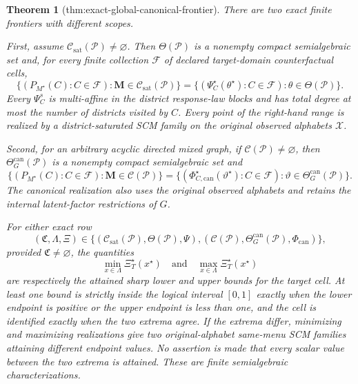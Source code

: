 \documentclass{article}
\newtheorem{theorem}{Theorem}
\begin{document}
\begin{theorem}[thm:exact-global-canonical-frontier]\label{thm:exact-global-canonical-frontier}
There are two exact finite frontiers with different scopes.

First, assume \(\mathcal C_{\mathrm{sat}}(\mathcal P)\ne\varnothing\). Then \(\Theta(\mathcal P)\) is a nonempty compact semialgebraic set and, for every finite collection \(\mathcal F\) of declared target-domain counterfactual cells,
\[
\{(P_{M^\star}(C):C\in\mathcal F):\mathbf M\in\mathcal C_{\mathrm{sat}}(\mathcal P)\}
=
\{(\Psi_C^\star(\theta^\star):C\in\mathcal F):\theta\in\Theta(\mathcal P)\}.
\]
Every \(\Psi_C^s\) is multi-affine in the district response-law blocks and has total degree at most the number of districts visited by \(C\). Every point of the right-hand range is realized by a district-saturated SCM family on the original observed alphabets \(\mathcal X\).

Second, for an arbitrary acyclic directed mixed graph, if \(\mathcal C(\mathcal P)\ne\varnothing\), then \(\Theta_G^{\mathrm{can}}(\mathcal P)\) is a nonempty compact semialgebraic set and
\[
\{(P_{M^\star}(C):C\in\mathcal F):\mathbf M\in\mathcal C(\mathcal P)\}
=
\{(\Phi_{C,\mathrm{can}}^\star(\vartheta^\star):C\in\mathcal F):
\vartheta\in\Theta_G^{\mathrm{can}}(\mathcal P)\}.
\]
The canonical realization also uses the original observed alphabets and retains the internal latent-factor restrictions of \(G\).

For either exact row
\[
(\mathfrak C,\Lambda,\Xi)
\in
\{(\mathcal C_{\mathrm{sat}}(\mathcal P),\Theta(\mathcal P),\Psi),
(\mathcal C(\mathcal P),\Theta_G^{\mathrm{can}}(\mathcal P),\Phi_{\mathrm{can}})\},
\]
provided \(\mathfrak C\ne\varnothing\), the quantities
\[
\min_{x\in\Lambda}\Xi_T^\star(x^\star)
\quad\text{and}\quad
\max_{x\in\Lambda}\Xi_T^\star(x^\star)
\]
are respectively the attained sharp lower and upper bounds for the target cell. At least one bound is strictly inside the logical interval \([0,1]\) exactly when the lower endpoint is positive or the upper endpoint is less than one, and the cell is identified exactly when the two extrema agree. If the extrema differ, minimizing and maximizing realizations give two original-alphabet same-menu SCM families attaining different endpoint values. No assertion is made that every scalar value between the two extrema is attained. These are finite semialgebraic characterizations.


\end{theorem}
\end{document}
